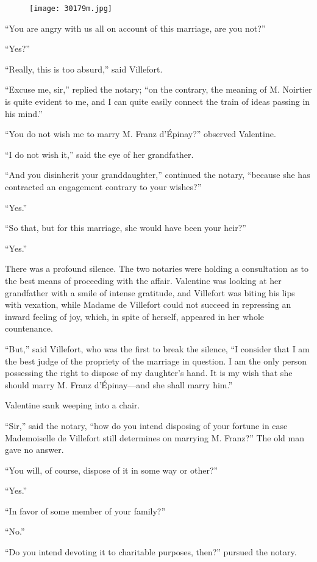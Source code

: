 \begin{figure}[ht]
\texttt{[image: 30179m.jpg]}
\end{figure}

“You are angry with us all on account of this marriage, are you not?”

“Yes?”

“Really, this is too absurd,” said Villefort.

“Excuse me, sir,” replied the notary; “on the contrary, the meaning of
M. Noirtier is quite evident to me, and I can quite easily connect the
train of ideas passing in his mind.”

“You do not wish me to marry M. Franz d’Épinay?” observed Valentine.

“I do not wish it,” said the eye of her grandfather.

“And you disinherit your granddaughter,” continued the notary, “because
she has contracted an engagement contrary to your wishes?”

“Yes.”

“So that, but for this marriage, she would have been your heir?”

“Yes.”

There was a profound silence. The two notaries were holding a
consultation as to the best means of proceeding with the affair.
Valentine was looking at her grandfather with a smile of intense
gratitude, and Villefort was biting his lips with vexation, while
Madame de Villefort could not succeed in repressing an inward feeling
of joy, which, in spite of herself, appeared in her whole countenance.

“But,” said Villefort, who was the first to break the silence, “I
consider that I am the best judge of the propriety of the marriage in
question. I am the only person possessing the right to dispose of my
daughter’s hand. It is my wish that she should marry M. Franz
d’Épinay—and she shall marry him.”

Valentine sank weeping into a chair.

“Sir,” said the notary, “how do you intend disposing of your fortune in
case Mademoiselle de Villefort still determines on marrying M. Franz?”
The old man gave no answer.

“You will, of course, dispose of it in some way or other?”

“Yes.”

“In favor of some member of your family?”

“No.”

“Do you intend devoting it to charitable purposes, then?” pursued the
notary.

